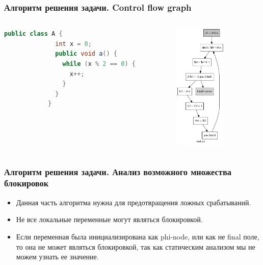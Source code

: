 \documentclass[t]{beamer}  %
\begin{document}
\begin{frame}[fragile]
  \frametitle{Алгоритм решения задачи. Control flow graph}


  \begin{columns}
			\vspace{2cm}
			\begin{lstlisting}[basicstyle=\tiny, language=Java]
			public class A {
			  int x = 0;
			  public void a() {
			    while (x % 2 == 0) {
			      x++;
			    }
			  }
			}
			 \end{lstlisting}
			  \begin{figure}[h]
				  \vspace{0pt}
				  \includegraphics[width=3.5cm, height=6cm]{synchronized.png}
			  \end{figure}
 	\end{columns}
\end{frame}


\begin{frame}[fragile]
  \frametitle{Алгоритм решения задачи. Анализ возможного множества блокировок}
\begin{itemize}
    \item Данная часть алгоритма нужна для предотвращения ложных срабатываний.
    \item Не все локальные переменные могут являться блокировкой.
    \item Если переменная была инициализирована как phi-node, или как не final поле, то она не может являться блокировкой, так как статическим анализом мы не можем узнать ее значение. 
  \end{itemize}
\end{frame}
\end{document}
